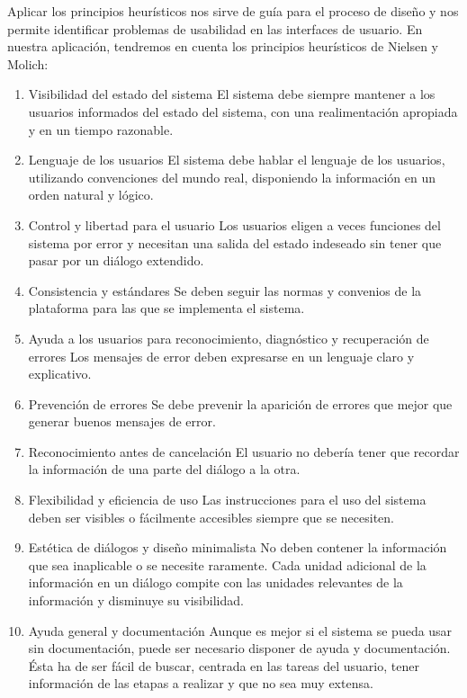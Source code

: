 Aplicar los principios heurísticos nos sirve de guía para el proceso de diseño y nos permite identificar problemas de usabilidad en las interfaces de usuario. En nuestra aplicación, tendremos en cuenta los principios heurísticos de Nielsen y Molich:


\begin{enumerate}
\item Visibilidad del estado del sistema
El sistema debe siempre mantener a los usuarios informados del estado del sistema, con una realimentación apropiada y en un tiempo razonable.
\item Lenguaje de los usuarios
El sistema debe hablar el lenguaje de los usuarios, utilizando convenciones del mundo real, disponiendo la información en un orden natural y lógico.
\item Control y libertad para el usuario
Los usuarios eligen a veces funciones del sistema por error y necesitan una salida del estado indeseado sin tener que pasar por un diálogo extendido.
\item Consistencia y estándares
Se deben seguir las normas y convenios de la plataforma para las que se implementa el sistema.
\item Ayuda a los usuarios para reconocimiento, diagnóstico y recuperación de errores
Los mensajes de error deben expresarse en un lenguaje claro y explicativo.
\item Prevención de errores
Se debe prevenir la aparición de errores que mejor que generar buenos mensajes de error.
\item Reconocimiento antes de cancelación
El usuario no debería tener que recordar la información de una parte del diálogo a la otra.
\item Flexibilidad y eficiencia de uso
Las instrucciones para el uso del sistema deben ser visibles o fácilmente accesibles siempre que se necesiten.
\item Estética de diálogos y diseño minimalista
No deben contener la información que sea inaplicable o se necesite raramente. Cada unidad adicional de la información en un diálogo compite con las unidades relevantes de la información y disminuye su visibilidad.
\item Ayuda general y documentación
Aunque es mejor si el sistema se pueda usar sin documentación, puede ser necesario disponer de ayuda y documentación. Ésta ha de ser fácil de buscar, centrada en las tareas del usuario, tener información de las etapas a realizar y que no sea muy extensa. \cite{eval_heuris}
\end{enumerate}


